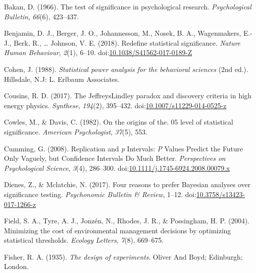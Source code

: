 \documentclass[,jou,floatsintext]{apa6}
\begin{document}
\leavevmode\hypertarget{ref-bakan_test_1966}{}%
Bakan, D. (1966). The test of significance in psychological research. \emph{Psychological Bulletin}, \emph{66}(6), 423--437.

\leavevmode\hypertarget{ref-benjamin_redefine_2018}{}%
Benjamin, D. J., Berger, J. O., Johannesson, M., Nosek, B. A., Wagenmakers, E.-J., Berk, R., \ldots{} Johnson, V. E. (2018). Redefine statistical significance. \emph{Nature Human Behaviour}, \emph{2}(1), 6--10. doi:\href{https://doi.org/10.1038/S41562-017-0189-Z}{10.1038/S41562-017-0189-Z}

\leavevmode\hypertarget{ref-cohen_statistical_1988}{}%
Cohen, J. (1988). \emph{Statistical power analysis for the behavioral sciences} (2nd ed.). Hillsdale, N.J: L. Erlbaum Associates.

\leavevmode\hypertarget{ref-cousins_jeffreyslindley_2017}{}%
Cousins, R. D. (2017). The JeffreysLindley paradox and discovery criteria in high energy physics. \emph{Synthese}, \emph{194}(2), 395--432. doi:\href{https://doi.org/10.1007/s11229-014-0525-z}{10.1007/s11229-014-0525-z}

\leavevmode\hypertarget{ref-cowles_origins_1982}{}%
Cowles, M., \& Davis, C. (1982). On the origins of the. 05 level of statistical significance. \emph{American Psychologist}, \emph{37}(5), 553.

\leavevmode\hypertarget{ref-cumming_replication_2008}{}%
Cumming, G. (2008). Replication and \emph{p} Intervals: \emph{P} Values Predict the Future Only Vaguely, but Confidence Intervals Do Much Better. \emph{Perspectives on Psychological Science}, \emph{3}(4), 286--300. doi:\href{https://doi.org/10.1111/j.1745-6924.2008.00079.x}{10.1111/j.1745-6924.2008.00079.x}

\leavevmode\hypertarget{ref-dienes_four_2017}{}%
Dienes, Z., \& Mclatchie, N. (2017). Four reasons to prefer Bayesian analyses over significance testing. \emph{Psychonomic Bulletin \& Review}, 1--12. doi:\href{https://doi.org/10.3758/s13423-017-1266-z}{10.3758/s13423-017-1266-z}

\leavevmode\hypertarget{ref-field_minimizing_2004}{}%
Field, S. A., Tyre, A. J., Jonzén, N., Rhodes, J. R., \& Possingham, H. P. (2004). Minimizing the cost of environmental management decisions by optimizing statistical thresholds. \emph{Ecology Letters}, \emph{7}(8), 669--675.

\leavevmode\hypertarget{ref-fisher_design_1935}{}%
Fisher, R. A. (1935). \emph{The design of experiments}. Oliver And Boyd; Edinburgh; London.
\end{document}

